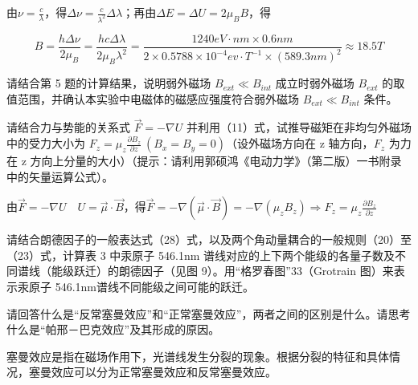 \documentclass[dvipsnames, svgnames,a4paper,11pt]{article}
\begin{document}
	由$\nu = \frac{c}{\lambda}$，得$\Delta \nu = \frac{c}{\lambda^2}\Delta \lambda$；再由$\Delta E = \Delta U =2 \mu_B B$，得

	\[
		B = \frac{h \Delta \nu}{2 \mu_B} = \frac{h c \Delta \lambda}{2 \mu_B \lambda^2} = \frac{1240eV \cdot nm \times 0.6nm}{2\times 0.5788\times 10^{-4}ev\cdot T^{-1} \times (589.3nm)^2} \approx 18.5T
	\]




\begin{question}
	请结合第 5 题的计算结果，说明弱外磁场 $B_{ext} \ll B_{int}$ 成立时弱外磁场 $B_{ext}$ 的取值范围，并确认本实验中电磁体的磁感应强度符合弱外磁场 $B_{ext} \ll B_{int}$ 条件。
\end{question}






\begin{question}
	请结合力与势能的关系式 $\vec{F} = -\nabla U $ 并利用（11）式，试推导磁矩在非均匀外磁场中的受力大小为 $F_z = \mu_z \frac{\partial B_z}{\partial z} \ (B_x = B_y = 0)$（设外磁场方向在 z 轴方向，$F_z$ 为力在 z 方向上分量的大小）（提示：请利用郭硕鸿《电动力学》（第二版）一书附录中的矢量运算公式）。
\end{question}

	由$\vec{F} = -\nabla U \quad U = \vec{\mu} \cdot \vec{B}$，得$\vec{F} = -\nabla(\vec{\mu} \cdot \vec{B}) = -\nabla(\mu_z B_z) \Rightarrow F_z = \mu_z \frac{\partial B_z}{\partial z} $






\begin{question}
	请结合朗德因子的一般表达式（28）式，以及两个角动量耦合的一般规则（20）至（23）式，计算表 3 中汞原子 546.1nm 谱线对应的上下两个能级的各量子数及不同谱线（能级跃迁）的朗德因子（见图 9）。用“格罗春图”33（Grotrain 图）来表示汞原子 546.1nm谱线不同能级之间可能的跃迁。
\end{question}









\begin{question}
	请回答什么是“反常塞曼效应”和“正常塞曼效应”，两者之间的区别是什么。请思考什么是“帕邢－巴克效应”及其形成的原因。
\end{question}


	塞曼效应是指在磁场作用下，光谱线发生分裂的现象。根据分裂的特征和具体情况，塞曼效应可以分为正常塞曼效应和反常塞曼效应。
\end{document}
